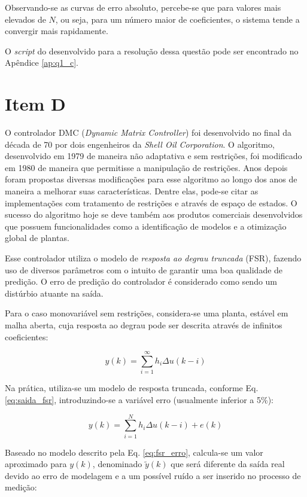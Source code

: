 Observando-se as curvas de erro absoluto, percebe-se que para valores mais
elevados de $N$, ou seja, para um número maior de coeficientes, o sistema
tende a convergir mais rapidamente.

O {\it script} do \Matlab desenvolvido para a resolução dessa questão pode
ser encontrado no Apêndice \ref{ap:q1_c}.

\section*{Item D}
O controlador DMC ({\it Dynamic Matrix Controller}) foi desenvolvido no final da
década de 70 por dois engenheiros da {\it Shell Oil Corporation}. O algoritmo,
desenvolvido em 1979 de maneira não adaptativa e sem restrições, foi modificado
em 1980 de maneira que permitisse a manipulação de restrições. Anos depois foram
propostas diversas modificações para esse algoritmo ao longo dos anos de maneira
a melhorar suas características. Dentre elas, pode-se citar as implementações
com tratamento de restrições e através de espaço de estados.  O sucesso do
algoritmo hoje se deve também aos produtos comerciais desenvolvidos que possuem
funcionalidades como a identificação de modelos e a otimização global de
plantas.

Esse controlador utiliza o modelo de {\it resposta ao degrau truncada} (FSR),
fazendo uso de diversos parâmetros com o intuito de garantir uma boa qualidade
de predição. O erro de predição do controlador é considerado como sendo um
distúrbio atuante na saída.

Para o caso monovariável sem restrições, considera-se uma planta, estável em
malha aberta, cuja resposta ao degrau pode ser descrita através de infinitos
coeficientes:

\begin{equation}\label{eq:fsr_inf}
y(k) = \sum_{i=1}^\infty h_i\Delta u(k-i)
\end{equation}

Na prática, utiliza-se um modelo de resposta truncada, conforme Eq.
\ref{eq:saida_fsr}, introduzindo-se a variável erro (usualmente inferior a 5\%):

\begin{equation}\label{eq:fsr_erro}
y(k) = \sum_{i=1}^N h_i\Delta u(k-i) + e(k)
\end{equation}

Baseado no modelo descrito pela Eq. \ref{eq:fsr_erro}, calcula-se um valor
aproximado para $y(k)$, denominado $\tilde{y}(k)$ que será diferente da saída
real devido ao erro de modelagem e a um possível ruído a ser inserido no
processo de medição: 

